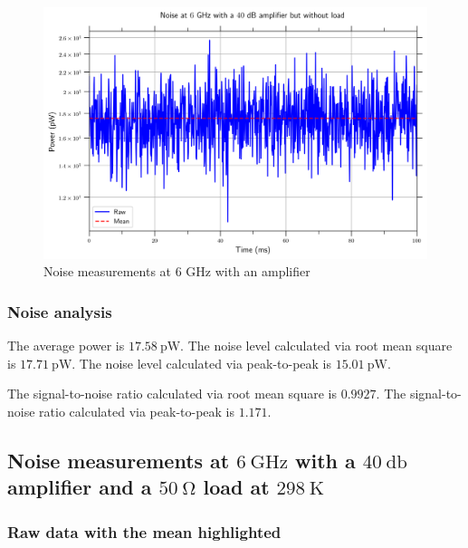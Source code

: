 \documentclass[english,12pt,a4paper]{article}
\begin{document}
\begin{figure}[H]
	\includegraphics[width=1\linewidth]{Plots/noise_floor_6_GHz_amplif}
	\caption{Noise measurements at 6 GHz with an amplifier}
	\label{fig:noisefloor6ghzamplif}
\end{figure}
 

\hypertarget{noise-analysis}{%
	\subsubsection{Noise analysis}\label{noise-analysis_3}}


	The average power is $\qty{17.58}{\pico\watt}$.
	The noise level calculated via root mean square is $\qty{17.71}{\pico\watt}$.
	The noise level calculated via peak-to-peak is $\qty{15.01}{\pico\watt}$.
	
	The signal-to-noise ratio calculated via root mean square is $0.9927$.
	The signal-to-noise ratio calculated via peak-to-peak is $1.171$.


\hypertarget{noise-measurements-at-6-ghz-with-a-40-db-amplifier-and-a-50-omega-load-at-298k}{%
	\subsection{Noise measurements at $\qty{6}{\giga\hertz}$ with a $\qty{40}{\decibel}$ amplifier and a $\qty{50}{\ohm}$ load at $\qty{298}{\kelvin}$}\label{noise-measurements-at-6-ghz-with-a-40-db-amplifier-and-a-50-omega-load-at-298k}}

 

\hypertarget{raw-data-with-the-mean-highlighted}{%
	\subsubsection{Raw data with the mean
		highlighted}\label{raw-data-with-the-mean-highlighted_3}}
\end{document}
